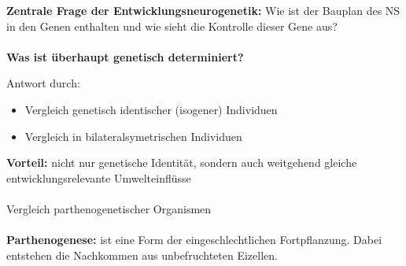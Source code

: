 \textbf{Zentrale Frage der Entwicklungsneurogenetik:} Wie ist der Bauplan des NS in den Genen enthalten und wie sieht die Kontrolle dieser Gene aus?
\\\\
\textbf{Was ist überhaupt genetisch determiniert?} 

Antwort durch:
\begin{itemize}
	\item Vergleich genetisch identischer (isogener) Individuen
	\item Vergleich in bilateralsymetrischen Individuen
\end{itemize}

\textbf{Vorteil:} nicht nur genetische Identität, sondern auch weitgehend gleiche entwicklungsrelevante Umwelteinflüsse
\\\\
Vergleich parthenogenetischer Organismen
\\\\
\textbf{Parthenogenese:} ist eine Form der eingeschlechtlichen Fortpflanzung. Dabei entstehen die Nachkommen aus unbefruchteten Eizellen.